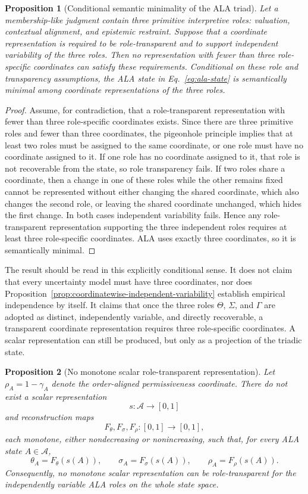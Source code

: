 \documentclass[reqno,final]{amsart}
\theoremstyle{definition}
\theoremstyle{plain}
\newtheorem{proposition}{Proposition}
\theoremstyle{remark}
\providecommand{\cA}{\mathcal{A}}
\begin{document}
\begin{proposition}[Conditional semantic minimality of the ALA triad]
\label{thm:semantic-minimality}
Let a membership-like judgment contain three primitive interpretive roles: valuation, contextual alignment, and epistemic restraint. Suppose that a coordinate representation is required to be role-transparent and to support independent variability of the three roles. Then no representation with fewer than three role-specific coordinates can satisfy these requirements. Conditional on these role and transparency assumptions, the ALA state in Eq.~\eqref{eq:ala-state} is semantically minimal among coordinate representations of the three roles.
\end{proposition}

\begin{proof}
Assume, for contradiction, that a role-transparent representation with fewer than three role-specific coordinates exists. Since there are three primitive roles and fewer than three coordinates, the pigeonhole principle implies that at least two roles must be assigned to the same coordinate, or one role must have no coordinate assigned to it. If one role has no coordinate assigned to it, that role is not recoverable from the state, so role transparency fails. If two roles share a coordinate, then a change in one of these roles while the other remains fixed cannot be represented without either changing the shared coordinate, which also changes the second role, or leaving the shared coordinate unchanged, which hides the first change. In both cases independent variability fails. Hence any role-transparent representation supporting the three independent roles requires at least three role-specific coordinates. ALA uses exactly three coordinates, so it is semantically minimal. 
\end{proof}

The result should be read in this explicitly conditional sense. It does not claim that every uncertainty model must have three coordinates, nor does Proposition~\ref{prop:coordinatewise-independent-variability} establish empirical independence by itself. It claims that once the three roles \(\Theta\), \(\Sigma\), and \(\Gamma\) are adopted as distinct, independently variable, and directly recoverable, a transparent coordinate representation requires three role-specific coordinates. A scalar representation can still be produced, but only as a projection of the triadic state.

\begin{proposition}[No monotone scalar role-transparent representation]
\label{prop:no-monotone-scalar-role-transparent}
Let \(\rho_A=1-\gamma_A\) denote the order-aligned permissiveness coordinate.
There do not exist a scalar representation
\[
s:\cA\to[0,1]
\]
and reconstruction maps
\[
F_\theta,F_\sigma,F_\rho:[0,1]\to[0,1],
\]
each monotone, either nondecreasing or nonincreasing, such that, for every
ALA state \(A\in\cA\),
\[
\theta_A=F_\theta(s(A)),\qquad
\sigma_A=F_\sigma(s(A)),\qquad
\rho_A=F_\rho(s(A)).
\]
Consequently, no monotone scalar representation can be role-transparent for
the independently variable ALA roles on the whole state space.
\end{proposition}
\end{document}
